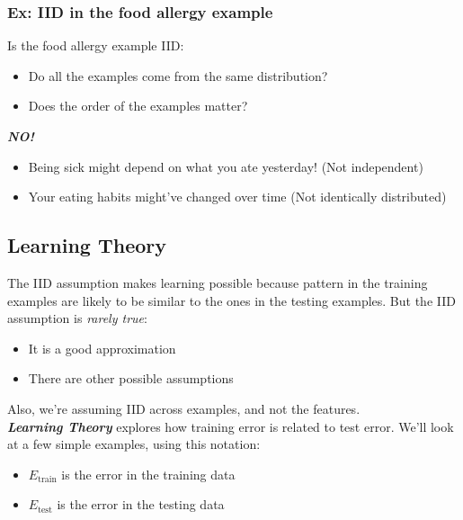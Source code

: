 \documentclass{article}
\theoremstyle{definition}
\begin{document}
\subsubsection*{Ex: IID in the food allergy example}
Is the food allergy example IID:
\begin{itemize}
	\item Do all the examples come from the same distribution?
	\item Does the order of the examples matter?
\end{itemize}
\textbf{\textsl{NO!}}
\begin{itemize}
	\item Being sick might depend on what you ate yesterday! (Not independent)
	\item Your eating habits might've changed over time (Not identically distributed)
\end{itemize}

\subsection*{Learning Theory}
The IID assumption makes learning possible because pattern in the training examples are likely to be similar to the ones in the testing examples. But the IID assumption is \textsl{rarely true}:
\begin{itemize}[label=-]
	\item It is a good approximation
	\item There are other possible assumptions
\end{itemize}
Also, we're assuming IID across examples, and not the features.\\
\textsl{\textbf{Learning Theory}} explores how training error is related to test error. We'll look at a few simple examples, using this notation:
\begin{itemize}
	\item $ E_{\text{train}} $ is the error in the training data
	\item $ E_{\text{test}} $ is the error in the testing data
\end{itemize}
\end{document}
